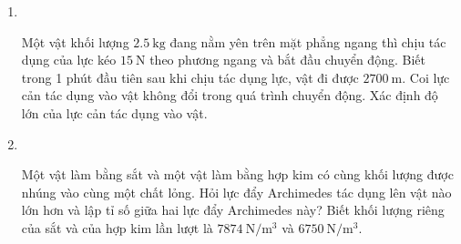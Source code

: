 \begin{enumerate}[label=\bfseries Bài \arabic*:,leftmargin=1.5cm]
{}

\item{}\\
{Một vật khối lượng $\SI{2.5}{\kilogram}$ đang nằm yên trên mặt phẳng ngang thì chịu tác dụng của lực kéo $\SI{15}{\newton}$ theo phương ngang và bắt đầu chuyển động. Biết trong 1 phút đầu tiên sau khi chịu tác dụng lực, vật đi được $\SI{2700}{\meter}$. Coi lực cản tác dụng vào vật không đổi trong quá trình chuyển động. Xác định độ lớn của lực cản tác dụng vào vật.

}
	
\item {}\\
{Một vật làm bằng sắt và một vật làm bằng hợp kim có cùng khối lượng được nhúng vào cùng một chất lỏng. Hỏi lực đẩy Archimedes tác dụng lên vật nào lớn hơn và lập tỉ số giữa hai lực đẩy Archimedes này? Biết khối lượng riêng của sắt và của hợp kim lần lượt là $\SI{7874}{\newton/\meter^3}$ và $\SI{6750}{\newton/\meter^3}$.

}
\end{enumerate}
